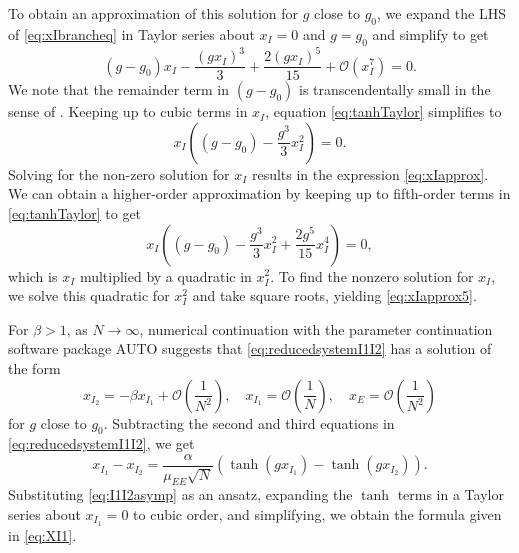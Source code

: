 \documentclass[reqno]{siamonline190516}
\begin{document}
To obtain an approximation of this solution for $g$ close to $g_0$, we expand the LHS of \cref{eq:xIbrancheq} in Taylor series about $x_I = 0$ and $g = g_0$ and simplify to get
\begin{equation}\label{eq:tanhTaylor}
(g-g_0) x_I - \frac{(g x_I)^3}{3} + \frac{2(g x_I)^5}{15} + \mathcal{O}\left( x_I^7 \right) = 0.
\end{equation}
We note that the remainder term in $(g-g_0)$ is transcendentally small in the sense of \cite{Holmes2012}. Keeping up to cubic terms in $x_I$, equation \cref{eq:tanhTaylor} simplifies to
\[
x_I \left( (g - g_0) - \frac{g^3}{3} x_I^2 \right) = 0.
\]
Solving for the non-zero solution for $x_I$ results in the expression \cref{eq:xIapprox}.
We can obtain a higher-order approximation by keeping up to fifth-order terms in \cref{eq:tanhTaylor} to get
\begin{equation*}
x_I \left( (g - g_0) - \frac{g^3}{3} x_I^2 + \frac{2 g^5}{15} x_I^4 \right) = 0,
\end{equation*}
which is $x_I$ multiplied by a quadratic in $x_I^2$. To find the nonzero solution for $x_I$, we solve this quadratic for $x_I^2$ and take square roots, yielding \cref{eq:xIapprox5}.

For $\beta > 1$, as $N \rightarrow \infty$, numerical continuation with the parameter continuation software package AUTO \cite{AUTO} suggests that \cref{eq:reducedsystemI1I2} has a solution of the form
\begin{equation}\label{eq:I1I2asymp}
    x_{I_2} = -\beta x_{I_1} + \mathcal{O}\left( \frac{1}{N^2} \right), \quad 
    x_{I_1} = \mathcal{O}\left( \frac{1}{N} \right), \quad
     x_E = \mathcal{O}\left( \frac{1}{N^2} \right)
\end{equation}
for $g$ close to $g_0$. Subtracting the second and third equations in \cref{eq:reducedsystemI1I2}, we get
\[
 x_{I_1} - x_{I_2} = \frac{\alpha}{\mu_{EE}\sqrt{N}}\left( \tanh(g x_{I_1}) - \tanh(g x_{I_2}) \right).
 \]
Substituting \cref{eq:I1I2asymp} as an ansatz, expanding the $\tanh$ terms in a Taylor series about $x_{I_1} = 0$ to cubic order, and simplifying, we obtain the formula given in \cref{eq:XI1}.
\end{document}
